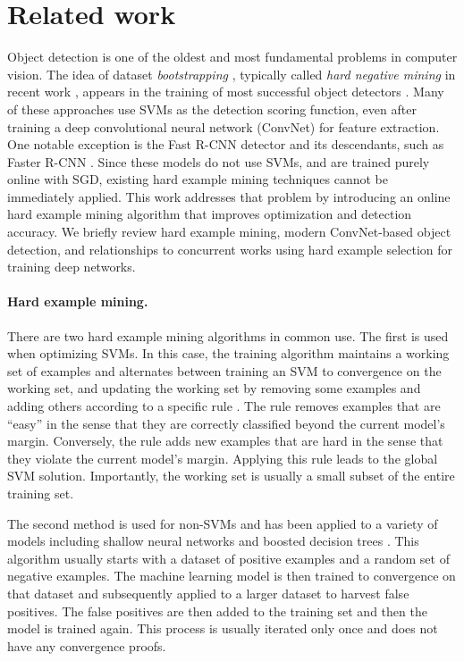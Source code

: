 \documentclass[10pt,twocolumn,letterpaper]{article}
\begin{document}
\section{Related work}
Object detection is one of the oldest and most fundamental problems in computer vision. The idea of dataset \emph{bootstrapping} \cite{sungThesis,rowley1998neural}, typically called \emph{hard negative mining} in recent work \cite{dpm}, appears in the training of most successful object detectors \cite{rowley1998neural,dollar,DalalTriggs,esvm,midlevel,dpm,rcnn,SPPnet,mrcnn}. Many of these approaches use SVMs as the detection scoring function, even after training a deep convolutional neural network (ConvNet) \cite{backprop,AlexNet} for feature extraction. One notable exception is the Fast R-CNN detector \cite{frcn} and its descendants, such as Faster R-CNN \cite{ren2015faster}. Since these models do not use SVMs, and are trained purely online with SGD, existing hard example mining techniques cannot be immediately applied. This work addresses that problem by introducing an online hard example mining algorithm that improves optimization and detection accuracy. We briefly review hard example mining, modern ConvNet-based object detection, and relationships to concurrent works using hard example selection for training deep networks.

\vspace{-0.1in}
\paragraph{Hard example mining.}
There are two hard example mining algorithms in common use. The first is used when optimizing SVMs. In this case, the training algorithm maintains a working set of examples and alternates between training an SVM to convergence on the working set, and updating the working set by removing some examples and adding others according to a specific rule \cite{dpm}. The rule removes examples that are ``easy'' in the sense that they are correctly classified beyond the current model's margin. Conversely, the rule adds new examples that are hard in the sense that they violate the current model's margin. Applying this rule leads to the global SVM solution. Importantly, the working set is usually a small subset of the entire training set. 

The second method is used for non-SVMs and has been applied to a variety of models including shallow neural networks \cite{rowley1998neural} and boosted decision trees \cite{dollar}. This algorithm usually starts with a dataset of positive examples and a random set of negative examples. The machine learning model is then trained to convergence on that dataset and subsequently applied to a larger dataset to harvest false positives. The false positives are then added to the training set and then the model is trained again. This process is usually iterated only once and does not have any convergence proofs.
\end{document}
